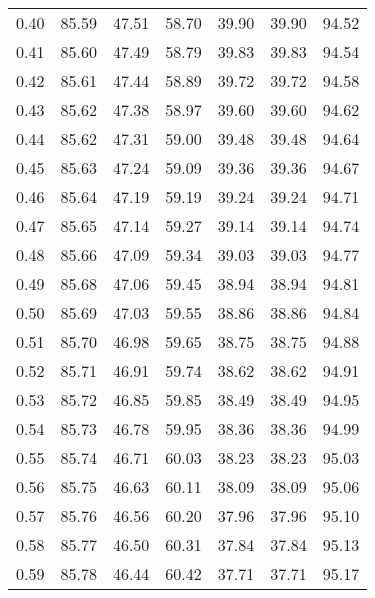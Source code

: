 \begin{tabular}{|c|c|c|c|c|c|c|}
      0.40 &     85.59 &     47.51 &      58.70 &   39.90 &      39.90 &         94.52 \\
      0.41 &     85.60 &     47.49 &      58.79 &   39.83 &      39.83 &         94.54 \\
      0.42 &     85.61 &     47.44 &      58.89 &   39.72 &      39.72 &         94.58 \\
      0.43 &     85.62 &     47.38 &      58.97 &   39.60 &      39.60 &         94.62 \\
      0.44 &     85.62 &     47.31 &      59.00 &   39.48 &      39.48 &         94.64 \\
      0.45 &     85.63 &     47.24 &      59.09 &   39.36 &      39.36 &         94.67 \\
      0.46 &     85.64 &     47.19 &      59.19 &   39.24 &      39.24 &         94.71 \\
      0.47 &     85.65 &     47.14 &      59.27 &   39.14 &      39.14 &         94.74 \\
      0.48 &     85.66 &     47.09 &      59.34 &   39.03 &      39.03 &         94.77 \\
      0.49 &     85.68 &     47.06 &      59.45 &   38.94 &      38.94 &         94.81 \\
      0.50 &     85.69 &     47.03 &      59.55 &   38.86 &      38.86 &         94.84 \\
      0.51 &     85.70 &     46.98 &      59.65 &   38.75 &      38.75 &         94.88 \\
      0.52 &     85.71 &     46.91 &      59.74 &   38.62 &      38.62 &         94.91 \\
      0.53 &     85.72 &     46.85 &      59.85 &   38.49 &      38.49 &         94.95 \\
      0.54 &     85.73 &     46.78 &      59.95 &   38.36 &      38.36 &         94.99 \\
      0.55 &     85.74 &     46.71 &      60.03 &   38.23 &      38.23 &         95.03 \\
      0.56 &     85.75 &     46.63 &      60.11 &   38.09 &      38.09 &         95.06 \\
      0.57 &     85.76 &     46.56 &      60.20 &   37.96 &      37.96 &         95.10 \\
      0.58 &     85.77 &     46.50 &      60.31 &   37.84 &      37.84 &         95.13 \\
      0.59 &     85.78 &     46.44 &      60.42 &   37.71 &      37.71 &         95.17 \\

\end{tabular}
